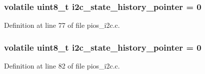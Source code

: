 \hypertarget{group___p_i_o_s___i2_c_gad02d69a4953e925d905e000697a0d885}{
\subsubsection[{i2c\-\_\-state\-\_\-history\-\_\-pointer}]{\setlength{\rightskip}{0pt plus 5cm}volatile uint8\-\_\-t {\bf i2c\-\_\-state\-\_\-history\-\_\-pointer} = 0}}\label{group___p_i_o_s___i2_c_gad02d69a4953e925d905e000697a0d885}


\-Definition at line 77 of file pios\-\_\-i2c.\-c.

\hypertarget{group___p_i_o_s___i2_c_gad02d69a4953e925d905e000697a0d885}{
\subsubsection[{i2c\-\_\-state\-\_\-history\-\_\-pointer}]{\setlength{\rightskip}{0pt plus 5cm}volatile uint8\-\_\-t {\bf i2c\-\_\-state\-\_\-history\-\_\-pointer} = 0}}\label{group___p_i_o_s___i2_c_gad02d69a4953e925d905e000697a0d885}


\-Definition at line 82 of file pios\-\_\-i2c.\-c.

